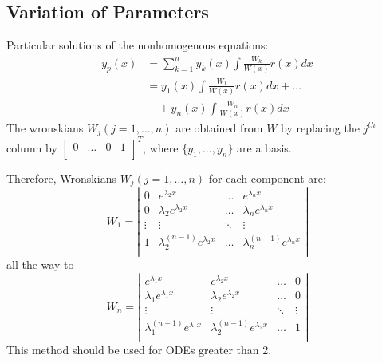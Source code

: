 \documentclass{article}
\renewcommand{\l}{\lambda}
\begin{document}
\subsection{Variation of Parameters}
Particular solutions of the nonhomogenous equations:
\begin{align*}
  y_p(x) &= \sum_{k=1}^{n}y_k(x)\int\frac{W_k}{W(x)}r(x)dx\\
  &= y_1(x)\int\frac{W_1}{W(x)}r(x)dx + \dots\\
  &\quad + y_n(x)\int\frac{W_n}{W(x)}r(x)dx
\end{align*}
The wronskians $W_j(j = 1,\dots, n)$ are obtained from $W$ by replacing the $j^{th}$ column by $\begin{bmatrix}
  0 & \dots & 0 & 1 \\
\end{bmatrix}^T$, where $\{y_1, \dots, y_n \}$ are a basis.

Therefore, Wronskians $W_j(j=1, \dots, n)$ for each component are:
$$   W_1 = \left|\begin{matrix}
    0 & e^{\l_2 x} & \dots & e^{\l_n x} \\
    0 & \l_2e^{\l_2 x} & \dots & \l_ne^{\l_n x} \\
    \vdots & \vdots & \ddots & \vdots \\
    1 & \l_2^{(n-1)}e^{\l_2 x} & \dots & \l_n^{(n-1)}e^{\l_n x}\\
  \end{matrix}\right|$$ all the way to $$W_n = \left|\begin{matrix}
      e^{\l_1 x} & e^{\l_2 x} & \dots & 0 \\
      \l_1e^{\l_1 x} & \l_2e^{\l_2 x} & \dots & 0 \\
      \vdots & \vdots & \ddots & \vdots \\
      \l_1^{(n-1)}e^{\l_1 x} & \l_2^{(n-1)}e^{\l_2 x} & \dots & 1\\
    \end{matrix}\right| $$
This method should be used for ODEs greater than 2.
\end{document}
